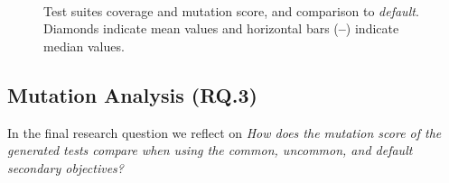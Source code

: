 \begin{figure}[t]
    \centering
    \hfill
    \\ 
   
    \caption{Test suites coverage and mutation score, and comparison to \textit{default}. Diamonds indicate mean values and horizontal bars (\textbf{--}) indicate median values.}
    \label{fig:rq2}
\end{figure}

\subsection{Mutation Analysis (RQ.3)}

In the final research question we reflect on \emph{How does the \emph{mutation score} of the generated tests  compare when using the \textit{common}, \textit{uncommon}, and \textit{default} secondary objectives? }

